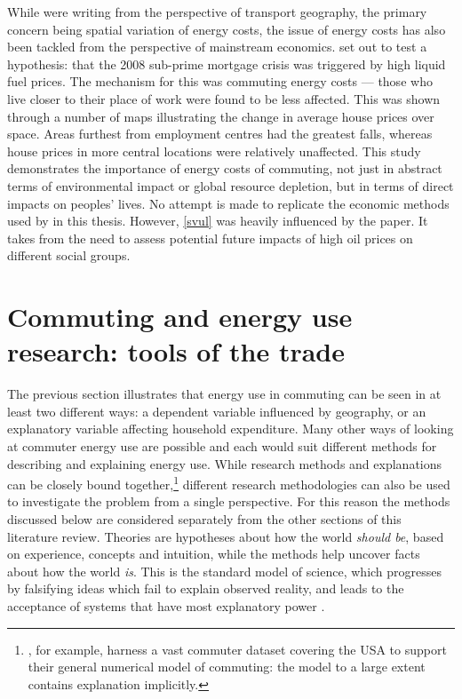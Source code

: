 While \citet{Boussauw2009} were writing from the perspective of transport
geography, the primary concern being spatial variation of energy costs,
the issue of energy costs has also been tackled from the perspective of
mainstream economics. \citet{Sexton2011} set out to
test a hypothesis: that the 2008 sub-prime mortgage crisis was triggered
by high liquid fuel prices. The mechanism for this was commuting energy costs ---
those who live closer to their place of work were found to be less affected.
This was shown through a number of maps illustrating the change in average
house prices over space. Areas furthest from employment centres had the greatest
falls, whereas house prices in more central locations were relatively unaffected.
This study demonstrates the importance of energy costs of commuting,
not just in abstract terms of environmental impact or global resource depletion,
but in terms of direct impacts on peoples' lives. No attempt is made to
replicate the economic methods used by \citet{Sexton2011} in this thesis.
However, \cref{svul} was heavily influenced by the paper. It takes from
\citet{Sexton2011} the need to assess potential future impacts of high oil prices
on different social groups.

\section{Commuting and energy use research: tools of the trade}
\label{s:tools}
The previous section illustrates that energy use in commuting can be seen in 
at least two different ways: a dependent variable influenced by geography, or
an explanatory variable affecting household expenditure.
Many other ways of looking at commuter energy use are possible and each
would suit different methods for describing and explaining
energy use. While research methods
and explanations can be closely bound
together,\footnote{\citet{Simini2012}, for
example, harness a vast commuter dataset covering the USA to support their
general numerical model of commuting: the model to a large extent
contains explanation implicitly.
}
different research methodologies
can also be used to investigate the problem from a single perspective.
For this reason the methods discussed below
are considered separately from the other sections of this literature review.
Theories are hypotheses about how the world \emph{should be}, based on
experience, concepts and intuition, while
the methods help uncover facts about how the world \emph{is}. This is the
standard model of science, which progresses by falsifying ideas which fail to
explain observed reality, and leads to the acceptance of systems that have most
explanatory power \citep{Popper1959}.

